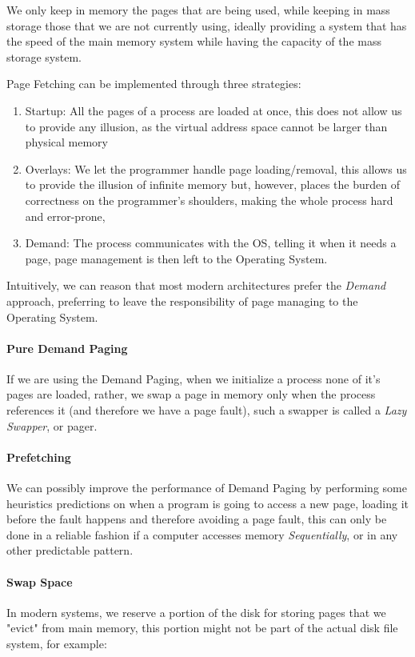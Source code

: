 \documentclass[openright, twoside]{report}
\theoremstyle{definition}
\theoremstyle{example}
\begin{document}
We only keep in memory the pages that are being used, while keeping in mass storage 
those that we are not currently using, ideally providing a system that has the speed of 
the main memory system while having the capacity of the mass storage system.

Page Fetching can be implemented through three strategies:

\begin{enumerate}
	\item Startup: All the pages of a process are loaded at once, this does not allow 
	us to provide any illusion, as the virtual address space cannot be larger than physical memory 
	\item Overlays: We let the programmer handle page loading/removal, this allows us to 
	provide the illusion of infinite memory but, however, places the burden of correctness on the 
	programmer's shoulders, making the whole process hard and error-prone,
	\item Demand: The process communicates with the OS, telling it when it needs a page, page management
	is then left to the Operating System.
\end{enumerate}

Intuitively, we can reason that most modern architectures prefer the \emph{Demand} approach, preferring to 
leave the responsibility of page managing to the Operating System.

\paragraph{Pure Demand Paging}
If we are using the Demand Paging, when we initialize a process none 
of it's pages are loaded, rather, we swap a page in memory only when 
the process references it (and therefore we have a page fault), such a
swapper is called a \emph{Lazy Swapper}, or pager.

\paragraph{Prefetching}
We can possibly improve the performance of Demand Paging by performing
some heuristics predictions on when a program is going to access a new page,
loading it before the fault happens and therefore avoiding a page fault, this 
can only be done in a reliable fashion if a computer accesses memory \emph{Sequentially},
or in any other predictable pattern.

\paragraph{Swap Space}
In modern systems, we reserve a portion of the disk for storing pages that 
we "evict" from main memory, this portion might not be part of the actual disk file system,
for example:
\end{document}
